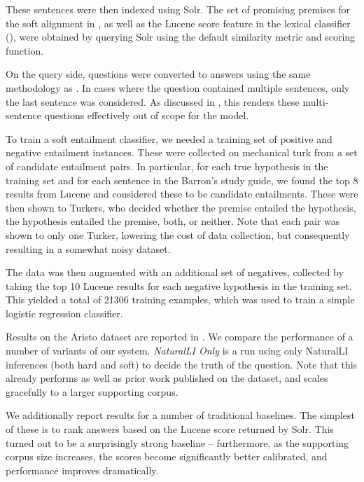 These sentences were then indexed using Solr.
The set of promising premises for the soft alignment in , as well as
  the Lucene score feature in the lexical classifier (),
  were obtained by querying Solr using the default similarity metric and scoring function.

On the query side, questions were converted to answers using the same methodology as
  .
In cases where the question contained multiple sentences, only the last sentence
  was considered.
As discussed in , 
  this renders these multi-sentence questions effectively out of scope for the model.

%
%
To train a soft entailment classifier, we needed a training set of positive
  and negative entailment instances.
These were collected on mechanical turk from a set of candidate entailment pairs.
In particular, for each true hypothesis in the training set and for each sentence
  in the Barron's study guide, we found the top 8 results from Lucene and considered
  these to be candidate entailments.
These were then shown to Turkers, who decided whether the premise entailed the
  hypothesis, the hypothesis entailed the premise, both, or neither.
Note that each pair was shown to only one Turker, lowering the cost of
  data collection, but consequently resulting in a somewhat noisy dataset.

The data was then augmented with an additional set of negatives, collected by taking
  the top 10 Lucene results for each negative hypothesis in the training set.
This yielded a total of \num{21306} training examples, which was used to train
  a simple logistic regression classifier.

%
%
Results on the Aristo dataset are reported in .
We compare the performance of a number of variants of our system.
\textit{NaturalLI Only} is a run using only NaturalLI inferences (both hard and
  soft) to decide the truth of the question.
Note that this already performs as well as prior work published on the dataset,
  and scales gracefully to a larger supporting corpus.

We additionally report results for a number of traditional baselines.
The simplest of these is to rank answers based on the Lucene score returned by
  Solr.
This turned out to be a surprisingly strong baseline -- furthermore, as the supporting
  corpus size increases, the scores become significantly better calibrated, and
  performance improves dramatically.

